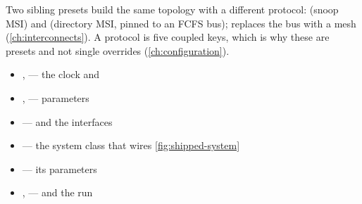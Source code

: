 Two sibling presets build the same topology with a different protocol:
 (snoop MSI) and  (directory
MSI, pinned to an FCFS bus);  replaces the bus with a mesh
(\cref{ch:interconnects}). A protocol is five coupled keys, which is why these are presets and
not single  overrides (\cref{ch:configuration}).

\begin{wherebox}
\begin{itemize}[nosep,leftmargin=1.2em]
\item {},  --- the clock and 
\item {},  --- parameters
\item {} ---  and the interfaces
\item {} --- the system class that wires \cref{fig:shipped-system}
\item {} --- its parameters
\item {},  ---  and the run
\end{itemize}
\end{wherebox}
